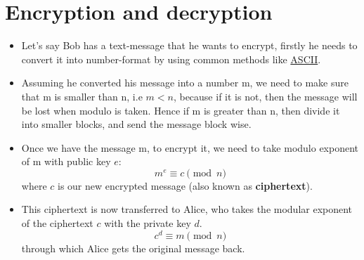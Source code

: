 \documentclass[12pt,a4paper]{report}
\begin{document}
\section{Encryption and decryption}
\begin{itemize}
    \item Let's say Bob has a text-message that he wants to encrypt, firstly he needs to convert it into number-format by using common methods like \href{https://en.wikipedia.org/wiki/ASCII}{ASCII}.
    \item Assuming he converted his message into a number m, we need to make sure that m is smaller than n, i.e $m<n$, because if it is not, then the message will be lost when modulo is taken. Hence if m is greater than n, then divide it into smaller blocks, and send the message block wise.
    \item Once we have the message m, to encrypt it, we need to take modulo exponent of m with public key $e$: 
    \[
    m^e \equiv c\pmod{n}
    \]
    where $c$ is our new encrypted message (also known as \textbf{ciphertext}).
    \item This ciphertext is now transferred to Alice, who takes the modular exponent of the ciphertext $c$ with the private key $d$.
    \[
    c^d \equiv m \pmod{n}
    \]
    through which Alice gets the original message back.
\end{itemize}
\end{document}
